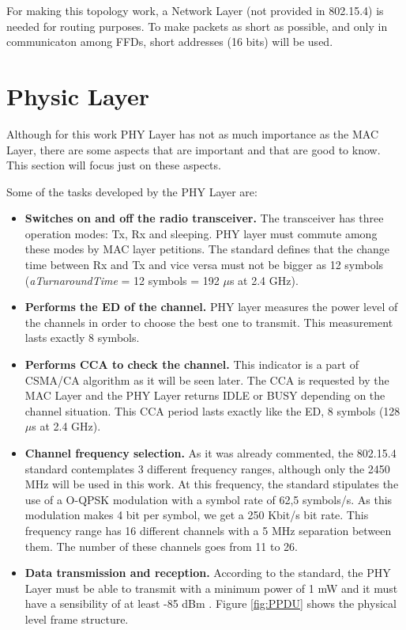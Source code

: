 For making this topology work, a Network Layer (not provided in 802.15.4) is needed for routing purposes. To make packets as short as possible,
and only in communicaton among \acp{FFD}, short addresses (16 bits) will be used.

\section{Physic Layer}

Although for this work \ac{PHY} Layer has not as much importance as the \ac{MAC} Layer, there are some aspects that are important and 
that are good to know. This section will focus just on these aspects.

Some of the tasks developed by the \ac{PHY} Layer are:

\begin{itemize}
 \item \textbf{Switches on and off the radio transceiver.} The transceiver has three operation modes: \ac{Tx}, \ac{Rx} and sleeping. \ac{PHY}
layer must commute among these modes by \ac{MAC} layer petitions. The standard defines that the change time between \ac{Rx} and 
\ac{Tx} and vice versa must not be bigger as 12 symbols (\textit{aTurnaroundTime} = 12 symbols = 192 $\mu$s at 2.4 GHz).
 \item \textbf{Performs the \ac{ED} of the channel.} \ac{PHY} layer measures the power level of the channels in order to choose the best one
to transmit. This measurement lasts exactly 8 symbols.
 \item \textbf{Performs \ac{CCA} to check the channel.} This indicator is a part of \ac{CSMA/CA} algorithm as it will be seen later. The
\ac{CCA} is requested by the \ac{MAC} Layer and the \ac{PHY} Layer returns IDLE or BUSY depending on the channel situation. This \ac{CCA}
period lasts exactly like the \ac{ED}, 8 symbols (128 $\mu$s at 2.4 GHz).
 \item \textbf{Channel frequency selection.} As it was already commented, the 802.15.4 standard contemplates 3 different frequency 
ranges, although only the 2450 MHz will be used in this work. At this frequency, the standard stipulates 
the use of a \ac{O-QPSK} modulation with a symbol rate of 62,5 symbols/s. As this modulation makes 4 bit per symbol, we get 
a 250 Kbit/s bit rate. This frequency range has 16 different channels with a 5 MHz separation between them. The number of 
these channels goes from 11 to 26.
 \item \textbf{Data transmission and reception.} According to the standard, the \ac{PHY} Layer must be able to transmit with a minimum
power of 1 mW and it must have a sensibility of at least -85 dBm \cite{IEEE802.15.4-2006}. Figure \ref{fig:PPDU} shows the physical level frame structure.


\end{itemize}
